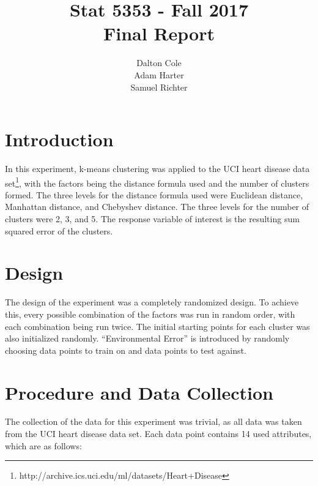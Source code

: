 \documentclass[times]{article}
\begin{document}
   \title{Stat 5353  - Fall 2017 \\ Final Report}
   \author{Dalton Cole \\ Adam Harter \\ Samuel Richter}
   \date{}
   \maketitle
   
   \section{Introduction}

   In this experiment, k-means clustering was applied to the UCI heart disease data 
   set\footnote{http://archive.ics.uci.edu/ml/datasets/Heart+Disease}, with the factors 
   being the distance formula used and the number of clusters formed.  
   The three levels for the distance formula used were Euclidean distance, 
   Manhattan distance, and Chebyshev distance.  
   The three levels for the number of clusters were 2, 3, and 5.  
   The response variable of interest is the resulting sum squared error of the clusters.

   \section{Design}

   The design of the experiment was a completely randomized design.
   To achieve this, every possible combination of the factors was run in random order,
   with each combination being run twice.
   The initial starting points for each cluster was also initialized randomly.
   ``Environmental Error'' is introduced by randomly choosing data points to train on and
   data points to test against.

   \section{Procedure and Data Collection}

   The collection of the data for this experiment was trivial, as all data was taken from the
   UCI heart disease data set.
   Each data point contains 14 used attributes, which are as follows:
\end{document}
